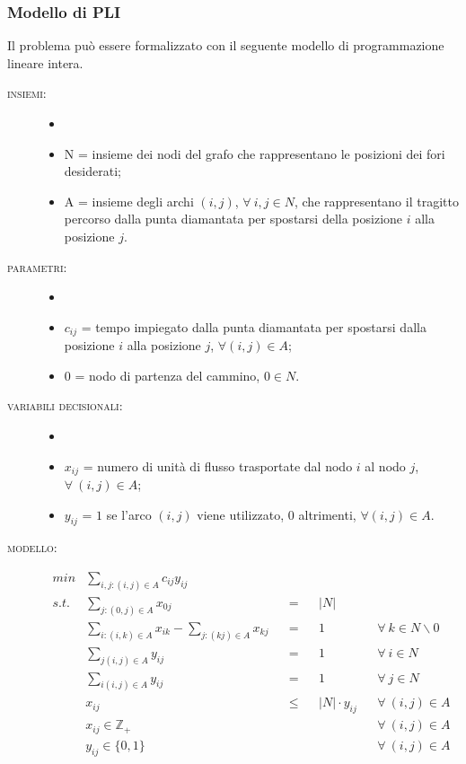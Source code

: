 \subsubsection{Modello di PLI}
Il problema può essere formalizzato con il seguente modello di programmazione lineare intera.
\begin{description}
\item[\textsc{insiemi:}]
	\begin{itemize}
	\item[]
	\item N = insieme dei nodi del grafo che rappresentano le posizioni dei fori desiderati;
	\item A = insieme degli archi $(i, j)$, $\forall\ i, j \in N$, che rappresentano il tragitto percorso dalla punta diamantata per spostarsi della posizione $i$ alla posizione $j$.
	\end{itemize}
\item[\textsc{parametri:}]
	\begin{itemize}
	\item[]
	\item $c_{ij}$ = tempo impiegato dalla punta diamantata per spostarsi dalla posizione $i$ alla posizione $j$, $\forall (i, j) \in A$;
	\item $0$ = nodo di partenza del cammino, $0 \in N$.
	\end{itemize}
\item[\textsc{variabili decisionali:}]
	\begin{itemize}
	\item[]
	\item $x_{ij}$ = numero di unità di flusso trasportate dal nodo $i$ al nodo $j$, $\forall\ (i, j) \in A$;
	\item $y_{ij}$ = $1$ se l'arco $(i, j)$ viene utilizzato, $0$ altrimenti, $\forall (i, j) \in A$.
	\end{itemize}
\item[\textsc{modello:}]
	\begin{align}
	min 	&\sum_{i,j:(i,j) \in A} c_{ij} y_{ij} \\
	s.t. 	&\sum_{j:(0,j) \in A} x_{0j} 								& &= 		& &|N| \\
			&\sum_{i:(i,k) \in A} x_{ik} - \sum_{j:(kj) \in A} x_{kj} 	& &= 		& & 1 			& &\forall\ k \in N \backslash {0} \\
			&\sum_{j(i,j) \in A} y_{ij} 								& &= 		& & 1 			& &\forall\ i \in N \\
			&\sum_{i(i,j) \in A} y_{ij} 								& &= 		& & 1 			& &\forall\ j \in N \\
			& x_{ij} 													& & \leq 	& & |N| \cdot y_{ij} 	& &\forall\ (i,j) \in A \\
			& x_{ij} \in \mathbb{Z_+}									& & 		& &				& &\forall\ (i,j) \in A \\
			& y_{ij} \in \{0,1\}										& &			& &				& &\forall\ (i,j) \in A
	\end{align}
\end{description}